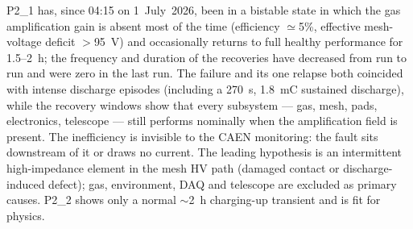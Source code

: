 \documentclass[11pt,a4paper]{article}
\newcommand{\detone}{P2\_1}
\newcommand{\dettwo}{P2\_2}
\begin{document}
\detone{} has, since 04:15 on 1~July~2026, been in a bistable state in which
the gas amplification gain is absent most of the time (efficiency
$\simeq$5\%, effective mesh-voltage deficit $>$95~V) and occasionally returns
to full healthy performance for 1.5--2~h; the frequency and duration of the
recoveries have decreased from run to run and were zero in the last run. The
failure and its one relapse both coincided with intense discharge episodes
(including a 270~s, 1.8~mC sustained discharge), while the recovery windows
show that every subsystem --- gas, mesh, pads, electronics, telescope ---
still performs nominally when the amplification field is present. The
inefficiency is invisible to the CAEN monitoring: the fault sits downstream
of it or draws no current. The leading hypothesis is an intermittent
high-impedance element in the mesh HV path (damaged contact or
discharge-induced defect); gas, environment, DAQ and telescope are excluded
as primary causes. \dettwo{} shows only a normal $\sim$2~h charging-up
transient and is fit for physics.
\end{document}
